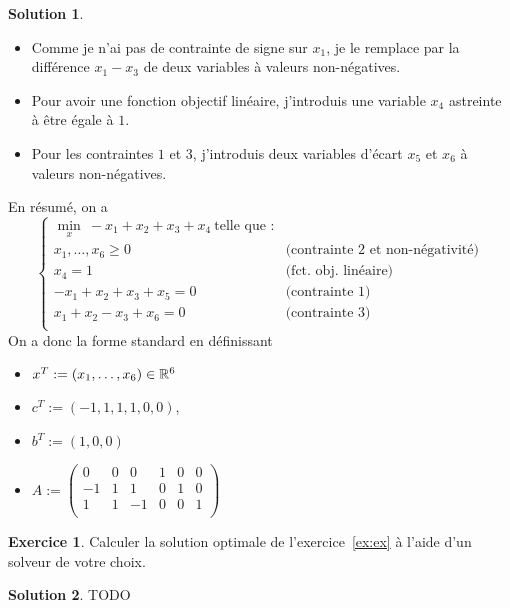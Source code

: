 \documentclass[a4paper,francais]{article}
\newcommand{\R}{{\ensuremath\mathbb{R}}}
\theoremstyle{definition}
\newtheorem{exercice}{Exercice}[section]
\newtheorem*{solution}{Solution}
\begin{document}
\begin{solution}
  \begin{itemize}
  \item Comme je n'ai pas de contrainte de signe sur $x_1$, je le remplace
    par la différence $x_1 - x_3$ de deux variables à valeurs non-négatives.
  \item Pour avoir une fonction objectif linéaire, j'introduis une variable
    $x_4$ astreinte à être égale à $1$.
  \item Pour les contraintes $1$ et $3$, j'introduis deux variables d'écart $x_5$ et $x_6$
    à valeurs non-négatives. 
  \end{itemize}
En résumé, on a 
\[
\left\{
\begin{array}{cl}
  \min_x \ -x_1 + x_2 + x_3 + x_4 \ \text{telle que :} & \\
  x_1, \dots, x_6 \geq 0 & \text{(contrainte 2 et non-négativité)} \\
  x_4 = 1 & \text{(fct. obj. linéaire)} \\
  -x_1 + x_2 + x_3 + x_5  = 0 & \text{(contrainte 1)} \\
  x_1 + x_2 - x_3 + x_6 = 0   & \text{(contrainte 3)} \\
\end{array}
\right.
\]
On a donc la forme standard en définissant
\begin{itemize}
\item $x^T := (x_1, \dots, x_6) \in \R^6$
\item $c^T := (-1, 1, 1, 1, 0, 0)$,
\item $b^T := (1, 0, 0)$
\item $A :=
  \left(
  \begin{array}{cccccc}
    0 & 0 & 0 & 1 & 0 & 0 \\
    -1 & 1 & 1 & 0 & 1 & 0 \\
    1 & 1 & -1 & 0 & 0 & 1 \\
  \end{array}
  \right)$
\end{itemize}
\end{solution}

\begin{exercice}
  Calculer la solution optimale de l'exercice~\ref{ex:ex} à l'aide d'un solveur
  de votre choix. 
\end{exercice}

\begin{solution}
  TODO
\end{solution}
\end{document}
